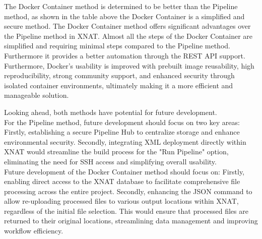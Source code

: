 The Docker Container method is determined to be better than the Pipeline method, as shown in the table above the Docker Container is a simplified and secure method.  
The Docker Container method offers significant advantages over the Pipeline method in XNAT.
Almost all the steps of the Docker Container are simplified and requiring minimal steps compared to the Pipeline method. Furthermore it provides a better automation through the REST API support.  Furthermore, Docker's usability is improved with prebuilt image reusability, high reproducibility, strong community support, and enhanced security through isolated container environments, ultimately making it a more efficient and manageable solution.

Looking ahead, both methods have potential for future development.\\
For the Pipeline method, future development should focus on two key areas: Firstly, establishing a secure Pipeline Hub to centralize storage and enhance environmental security. Secondly, integrating XML deployment directly within XNAT would streamline the build process for the "Run Pipeline" option, eliminating the need for SSH access and simplifying overall usability.\\
Future development of the Docker Container method should focus on: Firstly, enabling direct access to the XNAT database to facilitate comprehensive file processing across the entire project. Secondly, enhancing the JSON command to allow re-uploading processed files to various output locations within XNAT, regardless of the initial file selection. This would ensure that processed files are returned to their original locations, streamlining data management and improving workflow efficiency.
